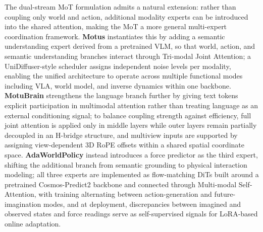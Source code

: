 The dual-stream MoT formulation admits a natural extension: rather than coupling only world and action, additional modality experts can be introduced into the shared attention, making the MoT a more general multi-expert coordination framework. \textbf{Motus}\cite{Motus} instantiates this by adding a semantic understanding expert derived from a pretrained VLM, so that world, action, and semantic understanding branches interact through Tri-modal Joint Attention; a UniDiffuser-style scheduler assigns independent noise levels per modality, enabling the unified architecture to operate across multiple functional modes including VLA, world model, and inverse dynamics within one backbone. \textbf{MotuBrain} \cite{MotuBrain} strengthens the language branch further by giving text tokens explicit participation in multimodal attention rather than treating language as an external conditioning signal; to balance coupling strength against efficiency, full joint attention is applied only in middle layers while outer layers remain partially decoupled in an H-bridge structure, and multiview inputs are supported by assigning view-dependent 3D RoPE offsets within a shared spatial coordinate space. \textbf{AdaWorldPolicy} \cite{AdaWorldPolicy} instead introduces a force predictor as the third expert, shifting the additional branch from semantic grounding to physical interaction modeling; all three experts are implemented as flow-matching DiTs built around a pretrained Cosmos-Predict2 backbone and connected through Multi-modal Self-Attention, with training alternating between action-generation and future-imagination modes, and at deployment, discrepancies between imagined and observed states and force readings serve as self-supervised signals for LoRA-based online adaptation.


